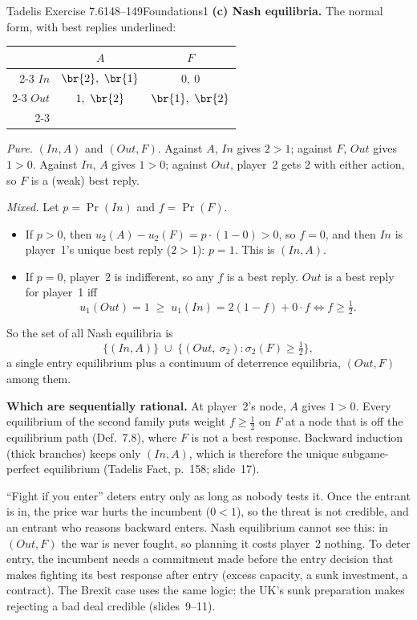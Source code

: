 \begin{exsol}{Tadelis Exercise 7.6}{148--149}{Foundations}{1}
\textbf{(c) Nash equilibria.} The normal form, with best replies underlined:
\begin{center}
\begin{tabular}{r|c|c|}
\multicolumn{1}{r}{} & \multicolumn{1}{c}{$A$} & \multicolumn{1}{c}{$F$}\\ \cline{2-3}
$\mathit{In}$  & $\br{2},\ \br{1}$ & $0,\ 0$ \\ \cline{2-3}
$\mathit{Out}$ & $1,\ \br{2}$ & $\br{1},\ \br{2}$ \\ \cline{2-3}
\end{tabular}
\end{center}
\emph{Pure.} $(\mathit{In},A)$ and $(\mathit{Out},F)$. Against $A$, $\mathit{In}$ gives $2 > 1$;
against $F$, $\mathit{Out}$ gives $1 > 0$. Against $\mathit{In}$, $A$ gives $1 > 0$; against
$\mathit{Out}$, player~2 gets 2 with either action, so $F$ is a (weak) best reply.

\emph{Mixed.} Let $p = \Pr(\mathit{In})$ and $f = \Pr(F)$.
\begin{itemize}
  \item If $p > 0$, then $u_2(A) - u_2(F) = p\cdot(1 - 0) > 0$, so $f = 0$, and then $\mathit{In}$
  is player~1's unique best reply ($2 > 1$): $p = 1$. This is $(\mathit{In},A)$.
  \item If $p = 0$, player~2 is indifferent, so any $f$ is a best reply. $\mathit{Out}$ is a best
  reply for player~1 iff
  \[
    u_1(\mathit{Out}) = 1 \;\ge\; u_1(\mathit{In}) = 2(1-f) + 0\cdot f
    \iff f \ge \tfrac12 .
  \]
\end{itemize}
So the set of all Nash equilibria is
\[
  \{(\mathit{In},A)\} \;\cup\; \bigl\{(\mathit{Out},\ \sigma_2) : \sigma_2(F) \ge \tfrac12\bigr\},
\]
a single entry equilibrium plus a continuum of deterrence equilibria, $(\mathit{Out},F)$ among them.

\textbf{Which are sequentially rational.} At player~2's node, $A$ gives $1 > 0$. Every equilibrium
of the second family puts weight $f \ge \frac12$ on $F$ at a node that is off the equilibrium path
(Def.~7.8), where $F$ is not a best response. Backward induction (thick branches) keeps only
$(\mathit{In},A)$, which is therefore the unique subgame-perfect equilibrium (Tadelis Fact,
p.~158; slide~17).

\interp ``Fight if you enter'' deters entry only as long as nobody tests it. Once the entrant is in,
the price war hurts the incumbent ($0 < 1$), so the threat is not credible, and an entrant who
reasons backward enters. Nash equilibrium cannot see this: in $(\mathit{Out},F)$ the war is never
fought, so planning it costs player~2 nothing. To deter entry, the incumbent needs a commitment
made before the entry decision that makes fighting its best response after entry (excess
capacity, a sunk investment, a contract). The Brexit case uses the same logic: the UK's sunk
preparation makes rejecting a bad deal credible (slides~9--11).


\end{exsol}
